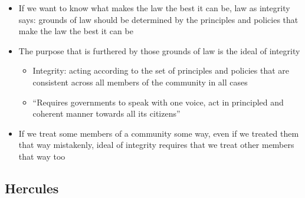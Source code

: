 \begin{itemize}
  \begin{itemize}
  \tightlist
  \item
    If we want to know what makes the law the best it can be, law as
    integrity says: grounds of law should be determined by the
    principles and policies that make the law the best it can be
  \item
    The purpose that is furthered by those grounds of law is the ideal
    of integrity

    \begin{itemize}
    \tightlist
    \item
      Integrity: acting according to the set of principles and policies
      that are consistent across all members of the community in all
      cases
    \item
      ``Requires governments to speak with one voice, act in principled
      and coherent manner towards all its citizens''
    \end{itemize}
  \item
    If we treat some members of a community some way, even if we treated
    them that way mistakenly, ideal of integrity requires that we treat
    other members that way too
  \end{itemize}
\end{itemize}

\hypertarget{hercules}{%
\subsection{Hercules}\label{hercules}}

